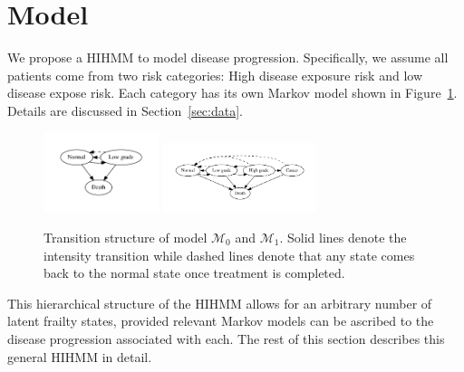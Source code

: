 \documentclass{article}
\begin{document}
\section{Model}
We propose a HIHMM to model disease progression. Specifically, we assume all patients come from two risk categories: High disease exposure risk and low disease expose risk. Each category has its own Markov model shown in Figure~\ref{fig:HHMM}. Details are discussed in Section~\ref{sec:data}.

\begin{figure}[ht!]
	\centering
	\includegraphics[width = 0.3\textwidth]{pic/M0}
	\includegraphics[width = 0.4\textwidth]{pic/M1}
	\caption{Transition structure of model $\mathcal{M}_0$ and $\mathcal{M}_1$. Solid lines denote the intensity transition while dashed lines denote that any state comes back to the normal state once treatment is completed.}
	\label{fig:HHMM}
\end{figure}

This hierarchical structure of the HIHMM allows for an arbitrary number of latent frailty states, provided relevant Markov models can be ascribed to the disease progression associated with each. The rest of this section describes this general HIHMM in detail.  
\end{document}
